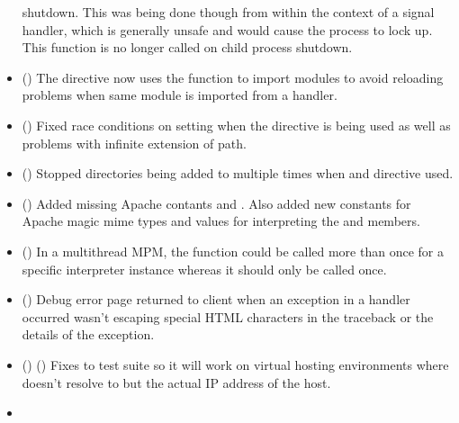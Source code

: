 \begin{itemize}
      shutdown. This was being done though from within the context of a
      signal handler, which is generally unsafe and would cause the process
      to lock up. This function is no longer called on child process shutdown.
    \item
      ()
      The  directive now uses the
       function to import modules to avoid
      reloading problems when same module is imported from a handler.
    \item
      ()
      Fixed race conditions on setting  when the
       directive is being used as well as problems with
      infinite extension of path.
    \item
      ()
      Stopped directories being added to  multiple times when
       and  directive used.
    \item
      ()
      Added missing Apache contants  and
      . Also added new constants for
      Apache magic mime types and values for interpreting the
       and  members.
    \item
      ()
      In a multithread MPM, the  function could be called
      more than once for a specific interpreter instance whereas it should
      only be called once.
    \item
      ()
      Debug error page returned to client when an exception in a handler
      occurred wasn't escaping special HTML characters in the traceback or
      the details of the exception.
    \item
      ()
      ()
      Fixes to test suite so it will work on virtual hosting environments
      where  doesn't resolve to  but the
      actual IP address of the host.
    \item

\end{itemize}
